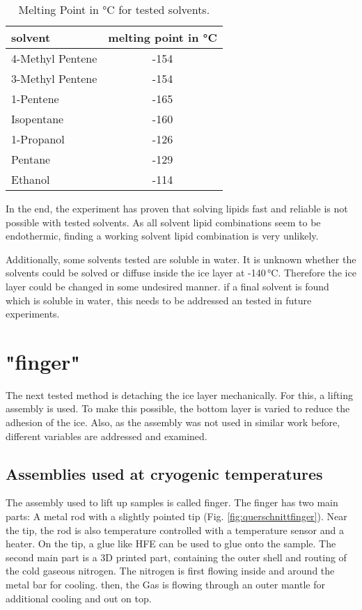 \begin{table}[hbt!]
	\centering
	\begin{tabular}{|l|c|}
		\hline
		solvent & melting point in °C \\
		\hline
		\hline
		4-Methyl Pentene & -154 \\ 
		\hline
		3-Methyl Pentene & -154 \\
		\hline
		1-Pentene & -165 \\
		\hline
		Isopentane & -160 \\
		\hline
		1-Propanol & -126 \\
		\hline
		Pentane & -129 \\
		\hline
		Ethanol & -114 \\
		\hline
	\end{tabular}
	\caption{Melting Point in °C for tested solvents.}
	\label{table:SchmelztemperaturLösungsmittel}
\end{table}

In the end, the experiment has proven that solving lipids fast and reliable is not possible with tested solvents. As all solvent lipid combinations seem to be endothermic, finding a working solvent lipid combination is very unlikely.

Additionally, some solvents tested are soluble in water. It is unknown whether the solvents could be solved or diffuse inside the ice layer at -140\,°C. Therefore the ice layer could be changed in some undesired manner. if a final solvent is found which is soluble in water, this needs to be addressed an tested in future experiments.

\section{"finger"}

The next tested method is detaching the ice layer mechanically. For this, a lifting assembly is used. To make this possible, the bottom layer is varied to reduce the adhesion of the ice. Also, as the assembly was not used in similar work before, different variables are addressed and examined.  

\subsection{Assemblies used at cryogenic temperatures}

The assembly used to lift up samples is called finger. The finger has two main parts: A metal rod with a slightly pointed tip (Fig. \ref{fig:querschnittfinger}). Near the tip, the rod is also temperature controlled with a temperature sensor and a heater. On the tip, a glue like HFE can be used to glue onto the sample. The second main part is a 3D printed part, containing the outer shell and routing of the cold gaseous nitrogen. The nitrogen is first flowing inside and around the metal bar for cooling. then, the Gas is flowing through an outer mantle for additional cooling and out on top.

